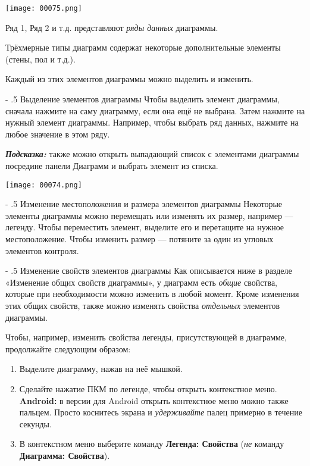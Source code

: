 \documentclass[a4paper,10pt]{article}
\makeatletter
\renewcommand\paragraph{%
   \@startsection{paragraph}{4}{0mm}%
      {-\baselineskip}%
      {.5\baselineskip}%
      {\normalfont\normalsize\bfseries}}
\makeatother
\begin{document}
\texttt{[image: 00075.png]}

Ряд 1, Ряд 2 и т.д. представляют \textit{ряды данных} диаграммы.

Трёхмерные типы диаграмм содержат некоторые дополнительные элементы (стены, пол и т.д.).

Каждый из этих элементов диаграммы можно выделить и изменить.

\paragraph{Выделение элементов диаграммы}
Чтобы выделить элемент диаграммы, сначала нажмите на саму диаграмму, если она ещё не выбрана. Затем нажмите на нужный элемент диаграммы. Например, чтобы выбрать ряд данных, нажмите на любое значение в этом ряду.

\begin{mdframed}[backgroundcolor=blue!10]
\textbf{\textit{Подсказка:}} также можно открыть выпадающий список с элементами диаграммы посредине панели Диаграмм и выбрать элемент из списка.
\end{mdframed}

\texttt{[image: 00074.png]}

\paragraph{Изменение местоположения и размера элементов диаграммы}
Некоторые элементы диаграммы можно перемещать или изменять их размер, например --- легенду. Чтобы переместить элемент, выделите его и перетащите на нужное местоположение. Чтобы изменить размер --- потяните за один из угловых элементов контроля.

\paragraph{Изменение свойств элементов диаграммы}
Как описывается ниже в разделе «Изменение общих свойств диаграммы», у диаграмм есть \textit{общие} свойства, которые при необходимости можно изменить в любой момент. Кроме изменения этих общих свойств, также можно изменять свойства \textit{отдельных} элементов диаграммы.

Чтобы, например, изменить свойства легенды, присутствующей в диаграмме, продолжайте следующим образом:

\begin{enumerate}
 \item Выделите диаграмму, нажав на неё мышкой.
 \item Сделайте нажатие ПКМ по легенде, чтобы открыть контекстное меню.\\
 \textbf{Android:} в версии для Android открыть контекстное меню можно также пальцем. Просто коснитесь экрана и \textit{удерживайте} палец примерно в течение секунды.
 \item В контекстном меню выберите команду \textbf{Легенда: Свойства} (\textit{не} команду \textbf{Диаграмма: Свойства}).
\end{enumerate}
\end{document}
